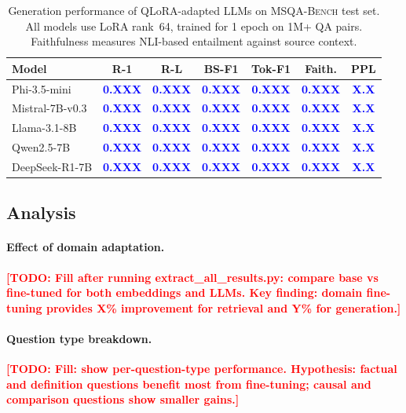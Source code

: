\documentclass[11pt]{article}
\newcommand{\msqa}{\textsc{MSQA-Bench}}
\newcommand{\todo}[1]{\textcolor{red}{\textbf{[TODO: #1]}}}
\newcommand{\placeholder}[1]{\textcolor{blue}{\textbf{#1}}}
\begin{document}
\begin{table}[t]
\centering
\caption{Generation performance of QLoRA-adapted LLMs on \msqa{} test set.
All models use LoRA rank~64, trained for 1 epoch on 1M+ QA pairs.
Faithfulness measures NLI-based entailment against source context.}
\label{tab:generation}
\small
\begin{tabular}{@{}l cccc cc@{}}
\toprule
\textbf{Model} & \textbf{R-1} & \textbf{R-L} & \textbf{BS-F1} & \textbf{Tok-F1} & \textbf{Faith.} & \textbf{PPL} \\
\midrule
Phi-3.5-mini        & \placeholder{0.XXX} & \placeholder{0.XXX} & \placeholder{0.XXX} & \placeholder{0.XXX} & \placeholder{0.XXX} & \placeholder{X.X} \\
Mistral-7B-v0.3     & \placeholder{0.XXX} & \placeholder{0.XXX} & \placeholder{0.XXX} & \placeholder{0.XXX} & \placeholder{0.XXX} & \placeholder{X.X} \\
Llama-3.1-8B        & \placeholder{0.XXX} & \placeholder{0.XXX} & \placeholder{0.XXX} & \placeholder{0.XXX} & \placeholder{0.XXX} & \placeholder{X.X} \\
Qwen2.5-7B          & \placeholder{0.XXX} & \placeholder{0.XXX} & \placeholder{0.XXX} & \placeholder{0.XXX} & \placeholder{0.XXX} & \placeholder{X.X} \\
DeepSeek-R1-7B      & \placeholder{0.XXX} & \placeholder{0.XXX} & \placeholder{0.XXX} & \placeholder{0.XXX} & \placeholder{0.XXX} & \placeholder{X.X} \\
\bottomrule
\end{tabular}
\end{table}

\subsection{Analysis}

\paragraph{Effect of domain adaptation.}
\todo{Fill after running extract\_all\_results.py: compare base vs fine-tuned
for both embeddings and LLMs. Key finding: domain fine-tuning provides X\%
improvement for retrieval and Y\% for generation.}

\paragraph{Question type breakdown.}
\todo{Fill: show per-question-type performance. Hypothesis: factual and
definition questions benefit most from fine-tuning; causal and comparison
questions show smaller gains.}
\end{document}
